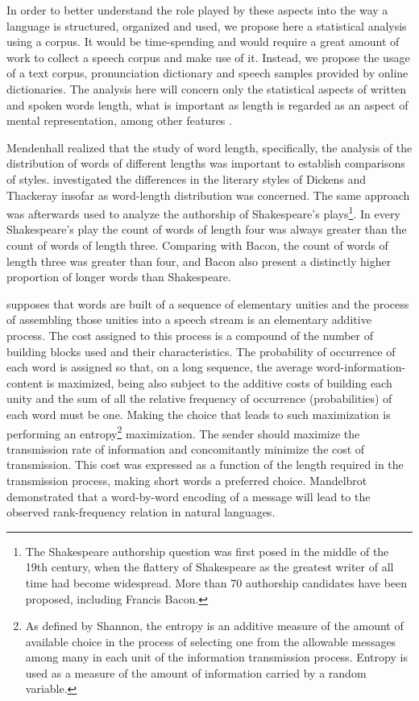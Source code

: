 In order to better understand the role played by these aspects into the way a language is
structured, organized and used, we propose here a statistical analysis using a corpus. 
It would be time-spending and would require a great amount of work to collect a speech corpus
and make use of it. Instead, we propose the usage of a text corpus, pronunciation dictionary
and speech samples provided by online dictionaries.
The analysis here will concern only the statistical aspects of written and spoken words length,
what is important as length is regarded as an aspect of mental representation, 
among other features \citep{port2007}.

Mendenhall realized that the study of word length, specifically, the analysis of the distribution
of words of different lengths was important to establish comparisons of styles. \cite{mendenhall1887}
investigated the differences in the literary 
styles of Dickens and Thackeray insofar as word-length distribution was concerned. The same approach
was afterwards used \citep{mendenhall1901} to analyze the authorship of Shakespeare's plays\footnote{
The Shakespeare authorship question was first posed in the middle of the 19th century,
when the flattery of Shakespeare as the greatest writer of all time had become widespread.
More than 70 authorship candidates have been proposed, including Francis Bacon.}.
In every Shakespeare's play the count of words of length four was always greater than the count of
words of length three. Comparing with Bacon, the count of words of length three was greater than four, and
Bacon also present a distinctly higher proportion of longer words than Shakespeare.

\cite{mandelbrot} supposes that words are built of a sequence of elementary unities and the process of 
assembling those unities into a speech stream is an elementary additive process. The cost
assigned to this process is a compound of the number of building blocks used and their characteristics.
The probability of occurrence 
of each word is assigned so that, on a long sequence, the average word-information-content
is maximized, being also subject to the additive costs of building each unity and the sum of
all the relative frequency of occurrence (probabilities) of each word must be one. Making the choice
that leads to such maximization is performing an entropy\footnote{As defined by Shannon, 
the entropy is an additive measure of the amount of available choice 
in the process of selecting one from the allowable messages among many in each unit of
the information transmission process. Entropy is used as a measure of the amount of information
carried by a random variable.} maximization.
The sender should maximize the transmission rate of information and concomitantly minimize
the cost of transmission. This cost was expressed as a function of the length required in the transmission
process, making short words a preferred choice. Mandelbrot demonstrated that a word-by-word encoding
of a message will lead to the observed rank-frequency relation in natural languages.

